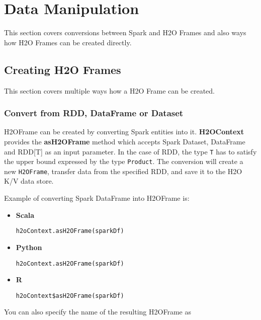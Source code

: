 \documentclass{standalone}
\begin{document}
    \section{Data Manipulation}

    This section covers conversions between Spark and H2O Frames and also ways how H2O Frames can be created directly.

    \subsection{Creating H2O Frames}

    This section covers multiple ways how a H2O Frame can be created.

    \subsubsection{Convert from RDD, DataFrame or Dataset}

    H2OFrame can be created by converting Spark entities into it. \textbf{H2OContext} provides the
    \textbf{asH2OFrame} method which accepts Spark Dataset, DataFrame and RDD[T] as an input parameter.
    In the case of RDD, the type \texttt{T} has to satisfy the upper bound expressed by the type \texttt{Product}.
    The conversion will create a new \texttt{H2OFrame}, transfer data from the specified RDD, and save it to the
    H2O K/V data store.

    Example of converting Spark DataFrame into H2OFrame is:

    \begin{itemize}
        \item \textbf{Scala} \begin{lstlisting}[style=Scala]
h2oContext.asH2OFrame(sparkDf)
        \end{lstlisting}
        \item \textbf{Python} \begin{lstlisting}[style=Python]
h2oContext.asH2OFrame(sparkDf)
        \end{lstlisting}
        \item \textbf{R} \begin{lstlisting}[style=R]
h2oContext$asH2OFrame(sparkDf)
        \end{lstlisting}
    \end{itemize}

    You can also specify the name of the resulting H2OFrame as
\end{document}
